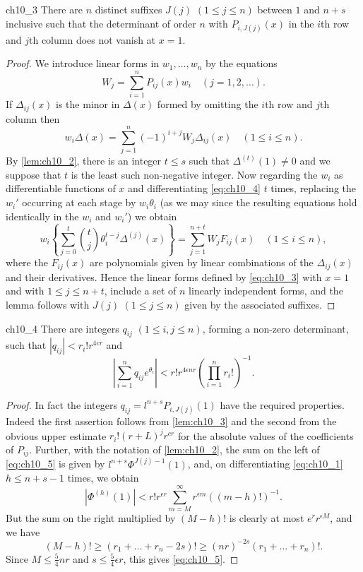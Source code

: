 \begin{mylemma}{}{ch10_3}
There are $n$ distinct suffixes $J(j)$ $(1 \le j \le n)$ between $1$ and $n+s$ inclusive such that the determinant of order $n$ with $P_{i,J(j)}(x)$ in the $i$th row and $j$th column does not vanish at $x=1$.
\end{mylemma}

\begin{proof}
We introduce linear forms in $w_1, \ldots, w_n$ by the equations
\[W_{j} = \sum_{i=1}^{n} P_{ij}(x) w_{i} \quad (j = 1, 2, \ldots). \tag{3}\label{eq:ch10_3}\]
If $\Delta_{ij}(x)$ is the minor in $\Delta(x)$ formed by omitting the $i$th row and $j$th column then
\[w_{i}\Delta(x) = \sum_{j=1}^{n} (-1)^{i+j} W_{j}\Delta_{ij}(x) \quad (1 \leq i \leq n). \tag{4}\label{eq:ch10_4}\]
By \autoref{lem:ch10_2}, there is an integer $t \leq s$ such that $\Delta^{(t)}(1) \neq 0$ and we suppose that $t$ is the least such non-negative integer. Now regarding the $w_i$ as differentiable functions of $x$ and differentiating \eqref{eq:ch10_4} $t$ times, replacing the $w_i'$ occurring at each stage by $w_i\theta_i$ (as we may since the resulting equations hold identically in the $w_i$ and $w_i'$) we obtain
\[w_i \left\{ \sum_{j=0}^t \binom{t}{j} \theta_i^{t-j} \Delta^{(j)}(x) \right\} = \sum_{j=1}^{n+t} W_j F_{ij}(x) \quad (1 \leq i \leq n),\]
where the $F_{ij}(x)$ are polynomials given by linear combinations of the $\Delta_{ij}(x)$ and their derivatives. Hence the linear forms defined by \eqref{eq:ch10_3} with $x = 1$ and with $1 \le j \le n + t$, include a set of $n$ linearly independent forms, and the lemma follows with $J(j)$ $(1 \le j \le n)$ given by the associated suffixes.
\end{proof}

\begin{mylemma}{}{ch10_4}
There are integers $q_{ij}$ $(1 \le i, j \le n)$, forming a non-zero determinant, such that $|q_{ij}| < r_i! r^{4cr}$ and
\[\left| \sum_{i=1}^{n} q_{ij} e^{\theta_i} \right| < r! r^{4\epsilon n r} \left( \prod_{i=1}^{n} r_i! \right)^{-1}. \tag{5}\label{eq:ch10_5}\]
\end{mylemma}

\begin{proof}
In fact the integers $q_{ij} = l^{n+s}P_{i,J(j)}(1)$ have the required properties. Indeed the first assertion follows from \autoref{lem:ch10_3} and the second from the obvious upper estimate $r_i! (r+L)^j r^{cr}$ for the absolute values of the coefficients of $P_{ij}$. Further, with the notation of \autoref{lem:ch10_2}, the sum on the left of \eqref{eq:ch10_5} is given by $l^{n+s}\Phi^{J(j)-1}(1)$, and, on differentiating \eqref{eq:ch10_1} $h \leq n+s-1$ times, we obtain
\[|\Phi^{(h)}(1)| < r! r^{\epsilon r} \sum_{m=M}^{\infty} r^{\epsilon m} ((m-h)!)^{-1}.\]
But the sum on the right multiplied by $(M-h)!$ is clearly at most $e^r r^{\epsilon M}$, and we have
\[(M-h)! \geqslant (r_1 + \ldots + r_n - 2s)! \geqslant (nr)^{-2s} (r_1 + \ldots + r_n)!.\]
Since $M \leq \frac{5}{4} nr$ and $s \leq \frac{5}{4} \epsilon r$, this gives \eqref{eq:ch10_5}.
\end{proof}

